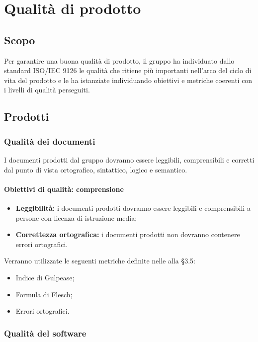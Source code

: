 \documentclass[PianoDiQualifica.tex]{subfiles}
\begin{document}
\chapter{Qualità di prodotto}

\section{Scopo}
Per garantire una buona qualità di prodotto, il gruppo \gruppo ha individuato dallo standard ISO/IEC 9126 le qualità che ritiene più importanti nell'arco del ciclo di vita del prodotto e le ha istanziate individuando obiettivi e metriche coerenti con i livelli di qualità perseguiti.

\section{Prodotti}

\subsection{Qualità dei documenti}
I documenti prodotti dal gruppo \gruppo dovranno essere leggibili, comprensibili e corretti dal punto di vista ortografico, sintattico, logico e semantico.
\subsubsection {Obiettivi di qualità: comprensione}
\begin{itemize}
	\item \textbf{Leggibilità:} i documenti prodotti dovranno essere leggibili e comprensibili a persone con licenza di istruzione media;
	\item \textbf{Correttezza ortografica:} i documenti prodotti non dovranno contenere errori ortografici.
\end{itemize}
Verranno utilizzate le seguenti metriche definite nelle \ndp alla \S{3.5}:
\begin{itemize}
	\item {} Indice di Gulpease;
	\item {} Formula di Flesch;
	\item {} Errori ortografici.
\end{itemize}

\subsection{Qualità del software}
\end{document}

